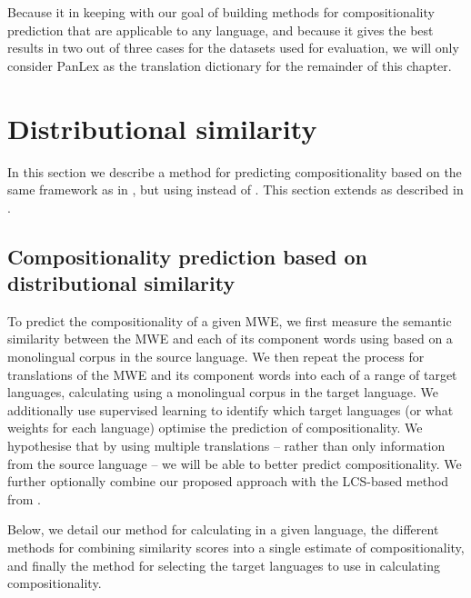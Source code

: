 \documentclass[output=paper,modfonts,nonflat]{langsci/langscibook}
\begin{document}
Because it in keeping with our goal of building methods for
compositionality prediction that are applicable to any language, and
because it gives the best results in two out of three cases for the
datasets used for evaluation, we will only consider PanLex as the
translation dictionary for the remainder of this chapter.


\section{Distributional similarity\label{sec:distsim}}

In this section we describe a method for predicting compositionality
based on the same framework as in , but using
 instead of . This section
extends \cite{DBLP:conf/eacl/SalehiCB14} as described in
.

\subsection{Compositionality prediction based on distributional similarity\label{sec:distsimmodel}}

To predict the compositionality of a given MWE, we first measure the
semantic similarity between the MWE and each of its component words
using  based on a monolingual corpus in the
source language.  We then repeat the process for translations of the
MWE and its component words into each of a range of target languages,
calculating  using a monolingual corpus in
the target language. We additionally use supervised learning to
identify which target languages (or what weights for each language)
optimise the prediction of compositionality. We hypothesise that by
using multiple translations -- rather than only information from the
source language -- we will be able to better predict
compositionality. We further optionally combine our proposed approach
with the LCS-based  method from
.

Below, we detail our method for calculating 
in a given language, the different methods for combining similarity
scores into a single estimate of compositionality, and finally the
method for selecting the target languages to use in calculating
compositionality.
\end{document}
